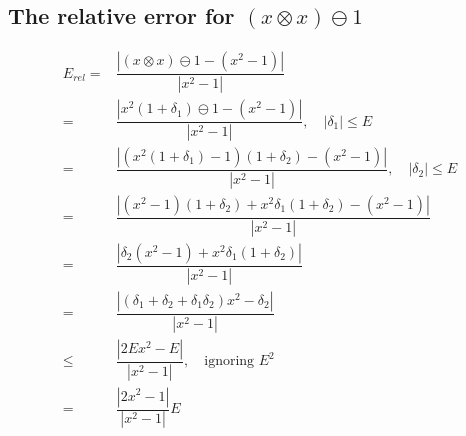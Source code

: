 \documentclass{article}
\begin{document}
\subsection*{The relative error for $(x \otimes x) \ominus 1$}
$$
    \begin{aligned}
        E_{rel}= & \dfrac{|(x \otimes x) \ominus 1 - (x^2 - 1)|}{|x^2 - 1|}                                         \\
        =        & \dfrac{|x^2 (1 + \delta_1) \ominus 1 - (x^2 - 1)|}{|x^2 - 1|}, \quad |\delta_1| \leq E           \\
        =        & \dfrac{|(x^2 (1 + \delta_1) - 1)(1 + \delta_2) - (x^2 - 1)|}{|x^2 - 1|}, \quad |\delta_2| \leq E \\
        =        & \dfrac{|(x^2 - 1)(1 + \delta_2) + x^2 \delta_1(1 + \delta_2) - (x^2 - 1)|}{|x^2 - 1|}            \\
        =        & \dfrac{|\delta_2(x^2 - 1) + x^2 \delta_1(1 + \delta_2)|}{|x^2 - 1|}                              \\
        =        & \dfrac{|(\delta_1+\delta_2+\delta_1\delta_2)x^2 - \delta_2|}{|x^2 - 1|}                          \\
        \leq     & \dfrac{|2Ex^2 - E|}{|x^2 - 1|},\quad\text{ignoring $E^2$}                                        \\
        =        & \boxed{\dfrac{|2x^2 - 1|}{|x^2 - 1|}E}                                                           \\
    \end{aligned}
$$
\end{document}
